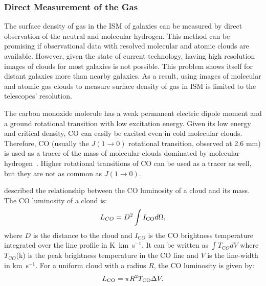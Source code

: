 \subsubsection{Direct Measurement of the Gas}

The surface density of gas in the ISM of galaxies can be measured by direct observation of the neutral and molecular hydrogen.
This method can be promising if observational data with resolved molecular and atomic clouds are available.
However, given the state of current technology, having high resolution images of clouds for most galaxies is not possible. 
This problem shows itself for distant galaxies more than nearby galaxies. 
As a result, using images of molecular and atomic gas clouds to measure surface density of gas in ISM is limited to the telescopes' resolution. 
 
The carbon monoxide molecule has a weak permanent electric dipole moment and a ground rotational transition with low excitation energy. 
Given its low energy and critical density, CO can easily be excited even in cold molecular clouds.
Therefore, CO (usually the $J(1\rightarrow 0)$ rotational transition, observed at 2.6 mm) is used as a tracer of the mass of molecular clouds dominated by molecular hydrogen~\citep[e.g.][] {Sanders84}.
Higher rotational transitions of CO can be used as a tracer as well, but they are not as common as $J(1\rightarrow 0)$.

\cite{Young91} described the relationship between the CO luminosity of a cloud and its mass. The CO luminosity of a cloud is:
\begin{equation}
L_{CO} = D^2 \int I_{\rm CO} d\Omega, 
\end{equation}
where $D$ is the distance to the cloud and $I_{\mathrm CO}$ is the CO brightness temperature integrated over the line profile in K~km~s$^{-1}$.
It can be written as ${\int T_{\mathrm CO} dV}$ where $T_{\mathrm CO}$(k) is the peak brightness temperature in the CO line and $V$ is the line-width in km~s$^{-1}$.
For a uniform cloud with a radius $R$, the CO luminosity is given by:
 \begin{equation}
L_{\rm CO} = \pi R^2 T_{\rm CO} \Delta V.
\end{equation}

